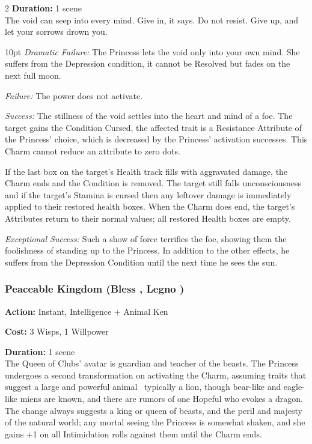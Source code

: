 \begin{multicols}{2}
\noindent \textbf{Duration:} 1 scene \\

\noindent The void can seep into every mind. Give in, it says. Do not resist. Give up, and let your sorrows drown you.

\begin{myindentpar}{10pt}    \emph{Dramatic Failure:} The Princess lets the void only into your own mind. She suffers from the Depression condition, it cannot be Resolved but fades on the next full moon.

    \emph{Failure:} The power does not activate.

    \emph{Success:} The stillness of the void settles into the heart and mind of a foe. The target gains the Condition Cursed, the affected trait is a Resistance Attribute of the Princess' choice, which is decreased by the Princess' activation successes. This Charm cannot reduce an attribute to zero dots. 
    
    If the last box on the target's Health track fills with aggravated damage, the Charm ends and the Condition is removed. The target still falls unconsciousness and if the target's Stamina is cursed then any leftover damage is immediately applied to their restored health boxes. When the Charm does end, the target's Attributes return to their normal values; all restored Health boxes are empty.

    \emph{Exceptional Success:} Such a show of force terrifies the foe, showing them the foolishness of standing up to the Princess. In addition to the other effects, he suffers from the Depression Condition until the next time he sees the sun.\end{myindentpar}

\subsubsection*{Peaceable Kingdom (Bless \textbullet\textbullet\textbullet\textbullet\textbullet, Legno \textbullet\textbullet\textbullet\textbullet)}

\noindent \textbf{Action:} Instant, Intelligence + Animal Ken

\noindent \textbf{Cost:} 3 Wisps, 1 Willpower

\noindent \textbf{Duration:} 1 scene \\

\noindent The Queen of Clubs' avatar is guardian and teacher of the beasts. The Princess undergoes a second transformation on activating the Charm, assuming traits that suggest a large and powerful animal \textendash\, typically a lion, though bear-like and eagle-like miens are known, and there are rumors of one Hopeful who evokes a dragon. The change always suggests a king or queen of beasts, and the peril and majesty of the natural world; any mortal seeing the Princess is somewhat shaken, and she gains +1 on all Intimidation rolls against them until the Charm ends.


\end{multicols}
